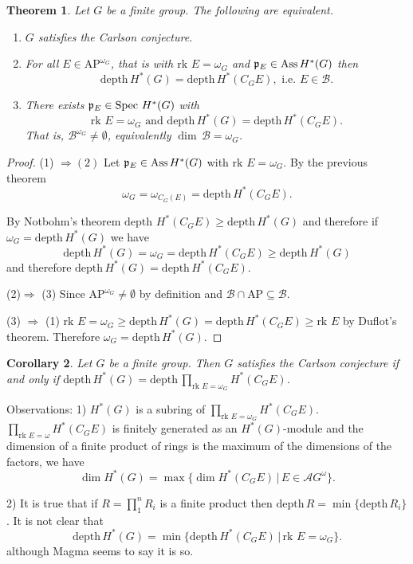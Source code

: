 \documentclass[reqno]{amsart}
\theoremstyle{plain}%
\newtheorem{thm}{Theorem}[section]
\newtheorem{cor}[thm]{Corollary}
\theoremstyle{definition}
\theoremstyle{remark}
\newcommand\sub{\subseteq}
\newcommand\mc[1]{\mathcal #1}
\newcommand\dph{\text{depth}\,}
\newcommand\as{\text{Ass}\,}
\newcommand\rk{\text{rk }}
\newcommand\p[1]{\frak p_{#1}}
\begin{document}
\begin{thm} Let $G$ be a finite group.  The following are equivalent.
\begin{enumerate}\item $G$ satisfies the Carlson conjecture.
\item For all $E\in\text{AP}^{\omega_G}$, that is with $\rk E=\omega_G$ and $\p E\in\as H^*(G)$ then $$\dph H^*(G)=\dph H^*(C_GE), \text{ i.e. } E\in\mc B. $$
\item There exists $\p E\in\text{Spec }H^*(G)$ with $$\rk E=\omega_G\text{ and }\dph H^*(G)=\dph H^*(C_GE).$$ That is, $\mc B^{\omega_G}\neq\emptyset$, equivalently $\dim\,\mc B=\omega_G$.
\end{enumerate}\end{thm}
\begin{proof}

\par (1) $\Rightarrow (2)$  Let $\p E\in\as H^*(G)$ with $\rk E=\omega_G$. By the previous theorem
$$ \omega_G=\omega_{C_G(E)}=\dph H^*(C_GE).$$

\noindent By Notbohm's theorem $\dph\, H^*(C_GE)\geq \dph H^*(G)$  and therefore if $\omega_G=\dph H^*(G)$ we have
$$\dph H^*(G)=\omega_G=\dph H^*(C_GE)\geq \dph H^*(G)$$ and therefore $\dph H^*(G)=\dph H^*(C_GE)$.

\medskip (2)$\Rightarrow$ (3) Since $\text{AP}^{\omega_G}\neq\emptyset$ by definition and $\mc B\cap\text{AP}\sub\mc B$.  

\medskip (3) $\Rightarrow$ (1)  $\rk E=\omega_G\geq\dph H^*(G)=\dph H^*(C_GE)\geq \rk E$ by Duflot's theorem.  Therefore $\omega_G=\dph H^*(G)$.
\end{proof}

\begin{cor} Let $G$ be a finite group.  Then $G$ satisfies the Carlson conjecture if and only if $\dph H^*(G)=\dph 
\prod_{\text{rk }E=\omega_G}H^*(C_GE)$.\end{cor}

\noindent Observations: 1) $H^*(G)$ is a subring of $\prod_{\text{rk }E=\omega_G}H^*(C_GE).$ $\prod_{\text{rk }E=\omega}H^*(C_GE)$ is finitely generated as an $H^*(G)$-module and the dimension of a finite product of rings is the maximum of the dimensions of the factors, we have $$\dim H^*(G)=\max\{\dim H^*(C_GE)\,\vert\, E\in \mc AG^\omega\}.$$
\par 2) It is true that if $R=\prod_1^nR_i$ is a finite product then $\dph R=\min\{\dph R_i\}$. It is not clear that 
$$\dph H^*(G)=\min\{\dph H^*(C_GE)\,\vert\, \text{rk }E=\omega_G\}.$$
although Magma seems to say it is so.
\end{document}
